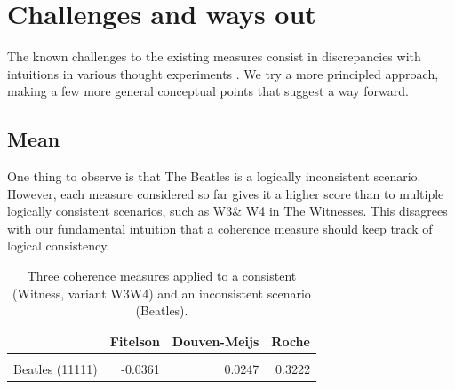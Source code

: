 \documentclass[10pt,]{scrartcl}
\begin{document}
\section{Challenges and ways out}\label{sec:challenges}


The known challenges to the existing measures  consist in discrepancies with intuitions in various thought experiments \citep{Merricks1995,shogenji1999conducive, Akiba2000Shogenjis, Shogenji2001Reply, bovens2004bayesian,Siebel2004On-Fitelsons-me,siebel2006against,Shogenji2006Why,crupi2007BayesianMeasuresEvidential, koscholke2016evaluating, Schippers2019General}. We try a more principled approach,  making a few more general conceptual points that suggest a way forward. 
















\subsection{Mean}\label{sec:mean}

One thing to observe is that \textsf{The Beatles} is a logically inconsistent scenario. However, each  measure considered so far gives it a higher score than to multiple  logically consistent scenarios, such as \textsf{W3}\& \textsf{W4} in  \textsf{The Witnesses}. This  disagrees with our fundamental
intuition that a coherence measure should keep track of logical
consistency. 



\begin{table}
\centering
\begin{tabular}{lrrr}
\toprule
  & Fitelson & Douven-Meijs & Roche\\
\midrule
\cellcolor{gray!6}{Witness W3W4 (11)} & \cellcolor{gray!6}{-0.2336} & \cellcolor{gray!6}{-0.1103} & \cellcolor{gray!6}{0.3147}\\
Beatles (11111) & -0.0361 & 0.0247 & 0.3222\\
\bottomrule
\end{tabular}
\caption{Three coherence measures applied to a consistent  (Witness, variant W3W4) and an inconsistent scenario (Beatles).}
\end{table}
\end{document}
